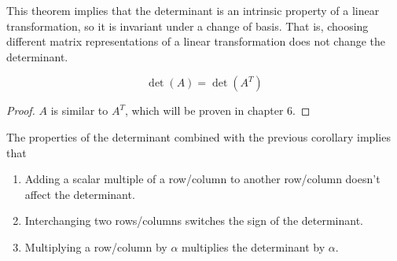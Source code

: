   This theorem implies that the determinant is an intrinsic property of a linear transformation, so it is invariant under a change of basis. That is, choosing different matrix representations of a linear transformation does not change the determinant.  

  \begin{corollary}
    \label{thm:determinant-of-a-transpose}
    \begin{equation}
      \det{(A)} = \det{(A^T)}
    \end{equation}
  \end{corollary}
  \begin{proof}
    $A$ is similar to $A^T$, which will be proven in chapter 6. 
  \end{proof}

  \begin{theorem}
    \label{thm:effect-of-row-operations-on-the-determinant}
    The properties of the determinant combined with the previous corollary implies that 
    \begin{enumerate}
      \item Adding a scalar multiple of a row/column to another row/column doesn't affect the determinant. 
      \item Interchanging two rows/columns switches the sign of the determinant. 
      \item Multiplying a row/column by $\alpha$ multiplies the determinant by $\alpha$. 
    \end{enumerate}
  \end{theorem}

